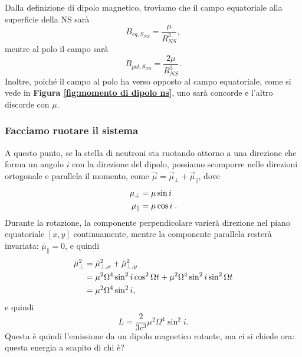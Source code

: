 Dalla definizione di dipolo magnetico, troviamo che il campo equatoriale alla superficie della NS sarà
\begin{equation}
    B_{eq,S_{NS}} = \frac{\mu}{R_{NS}^3},
\end{equation}
mentre al polo il campo sarà
\begin{equation}
    B_{pol,S_{NS}}=\frac{2\mu}{R_{NS}^3}.
\end{equation}
Inoltre, poiché il campo al polo ha verso opposto al campo equatoriale, come si vede in \textbf{Figura \ref{fig:momento di dipolo ns}}, uno sarà concorde e l'altro discorde con $\mu$.
\subsubsection{Facciamo ruotare il sistema}
A questo punto, se la stella di neutroni sta ruotando attorno a una direzione che forma un angolo $i$ con la direzione del dipolo, possiamo scomporre nelle direzioni ortogonale e parallela il momento, come $\vec{\mu}=\vec{\mu}_{\perp}+\vec{\mu}_\parallel $, dove
\begin{align}
   \mu_{\perp} & =  \mu \sin{i}\\
   \mu_\parallel & =  \mu \cos{i}\hspace{1mm}.
\end{align}
Durante la rotazione, la componente perpendicolare varierà direzione nel piano equatoriale $[x,y]$ continuamente, mentre la componente parallela resterà invariata: $\ddot{\mu_\parallel}=0$, e quindi
\begin{align}
    \ddot{\mu}^2_{\perp}&=\ddot{\mu}_{\perp,x}^2+\ddot{\mu}_{\perp,y}^2\notag\\
    &= \mu^2\Omega^4\sin^2{i}\cos^2{\Omega t}+\mu^2\Omega^4\sin^2{i}\sin^2{\Omega t}\notag\\
    &= \mu^2\Omega^4\sin^2{i},
\end{align}
e quindi
\begin{equation}
    \boxed{L=\frac{2}{3c^3}\mu^2\Omega^4\sin^2{i}}.
    \label{eq: emissione dipolo magnetico rotante}
\end{equation}
Questa è quindi l'emissione da un dipolo magnetico rotante, ma ci si chiede ora: questa energia a scapito di chi è?

